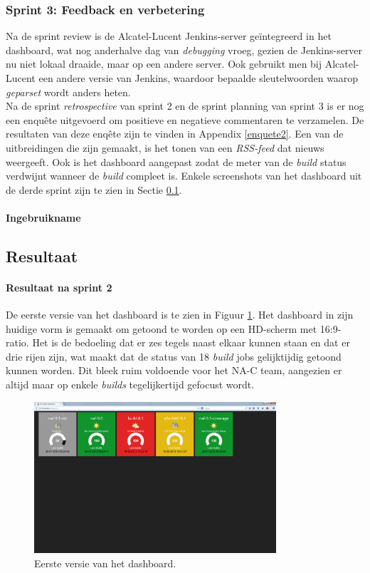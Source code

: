 \documentclass[10pt,a4paper]{article}
\begin{document}
\subsubsection{Sprint 3: Feedback en verbetering}
\label{sprint3}
Na de sprint review is de Alcatel-Lucent Jenkins-server ge\"integreerd in het dashboard, wat nog anderhalve dag van \textit{debugging} vroeg, gezien de Jenkins-server nu niet lokaal draaide, maar op een andere server. Ook gebruikt men bij Alcatel-Lucent een andere versie van Jenkins, waardoor bepaalde sleutelwoorden waarop \textit{geparset} wordt anders heten.\\
Na de sprint \textit{retrospective} van sprint 2 en de sprint planning van sprint 3 is er nog een enqu\^ete uitgevoerd om positieve en negatieve commentaren te verzamelen. De resultaten van deze enq\^ete zijn te vinden in Appendix \ref{enquete2}.
Een van de uitbreidingen die zijn gemaakt, is het tonen van een \textit{RSS-feed} dat nieuws weergeeft. Ook is het dashboard aangepast zodat de meter van de \textit{build} status verdwijnt wanneer de \textit{build} compleet is. Enkele screenshots van het dashboard uit de derde sprint zijn te zien in Sectie \ref{resultaat}.
\paragraph{Ingebruikname} 
\subsection{Resultaat}
\label{resultaat}
\paragraph{Resultaat na sprint 2}
De eerste versie van het dashboard is te zien in Figuur \ref{dash_1}. Het dashboard in zijn huidige vorm is gemaakt om getoond te worden op een HD-scherm met 16:9-ratio. Het is de bedoeling dat er zes tegels naast elkaar kunnen staan en dat er drie rijen zijn, wat maakt dat de status van 18 \textit{build} jobs gelijktijdig getoond kunnen worden. Dit bleek ruim voldoende voor het NA-C team, aangezien er altijd maar op enkele \textit{builds} tegelijkertijd gefocust wordt.

\begin{figure}[ht!]
\centering
\includegraphics[width=90mm]{dashboard_screenshot1.png}
\caption{Eerste versie van het dashboard.} 
\label{dash_1}
\end{figure}
\end{document}
